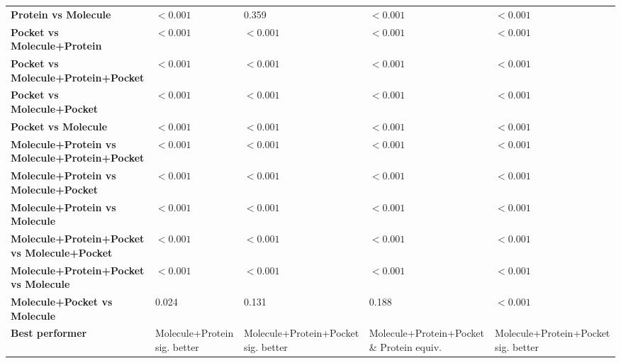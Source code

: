 \begin{table}[H]
{\begin{tabular}{lllll}
        \textbf{Protein vs Molecule} & $< 0.001$ & 0.359 & $< 0.001$ & $< 0.001$ \\
        \textbf{Pocket vs Molecule+Protein} & $< 0.001$ & $< 0.001$ & $< 0.001$ & $< 0.001$ \\
        \textbf{Pocket vs Molecule+Protein+Pocket} & $< 0.001$ & $< 0.001$ & $< 0.001$ & $< 0.001$ \\
        \textbf{Pocket vs Molecule+Pocket} & $< 0.001$ & $< 0.001$ & $< 0.001$ & $< 0.001$ \\
        \textbf{Pocket vs Molecule} & $< 0.001$ & $< 0.001$ & $< 0.001$ & $< 0.001$ \\
        \textbf{Molecule+Protein vs Molecule+Protein+Pocket} & $< 0.001$ & $< 0.001$ & $< 0.001$ & $< 0.001$ \\
        \textbf{Molecule+Protein vs Molecule+Pocket} & $< 0.001$ & $< 0.001$ & $< 0.001$ & $< 0.001$ \\
        \textbf{Molecule+Protein vs Molecule} & $< 0.001$ & $< 0.001$ & $< 0.001$ & $< 0.001$ \\
        \textbf{Molecule+Protein+Pocket vs Molecule+Pocket} & $< 0.001$ & $< 0.001$ & $< 0.001$ & $< 0.001$ \\
        \textbf{Molecule+Protein+Pocket vs Molecule} & $< 0.001$ & $< 0.001$ & $< 0.001$ & $< 0.001$ \\
        \textbf{Molecule+Pocket vs Molecule} & 0.024 & 0.131 & 0.188 & $< 0.001$ \\
        \textbf{Best performer} & Molecule+Protein sig. better & Molecule+Protein+Pocket sig. better & Molecule+Protein+Pocket \& Protein equiv. & Molecule+Protein+Pocket sig. better \\
        \bottomrule
    \end{tabular}}
\end{table}